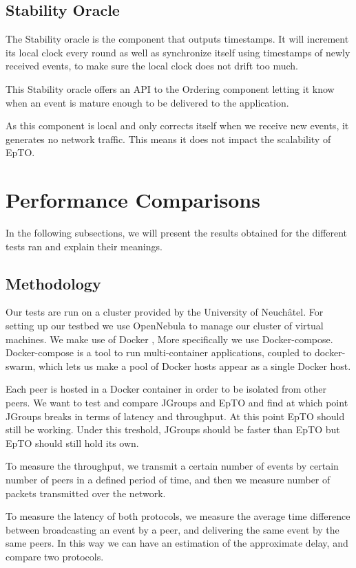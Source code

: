 \documentclass[10pt,conference,a4paper]{IEEEtran}
\begin{document}
\subsection{Stability Oracle}
The Stability oracle is the component that outputs timestamps. It will increment its local clock every round as well as synchronize itself using timestamps of newly received events, to make sure the local clock does not drift too much.
\par
This Stability oracle offers an API to the Ordering component letting it know when an event is mature enough to be delivered to the application.
\par
As this component is local and only corrects itself when we receive new events, it generates no network traffic. This means it does not impact the scalability of EpTO.
\section{Performance Comparisons}
In the following subsections, we will present the results obtained for the different tests ran and explain their meanings.
\subsection{Methodology}
\label{sub:metho}
Our tests are run on a cluster provided by the University of Neuchâtel. For setting up our testbed we use OpenNebula \autocite{opennebula} to manage our cluster of virtual machines. We make use of Docker \autocite{docker}, More specifically we use Docker-compose. Docker-compose is a tool to run multi-container applications, coupled to docker-swarm, which lets us make a pool of Docker hosts appear as a single Docker host.
\par
Each peer is hosted in a Docker container in order to be isolated from other peers. We want to test and compare JGroups and EpTO and find at which point JGroups breaks in terms of latency and throughput. At this point EpTO should still be working. Under this treshold, JGroups should be faster than EpTO but EpTO should still hold its own.
\par
To measure the throughput, we transmit a certain number of events by certain number of peers in a defined period of time, and then we measure number of packets transmitted over the network.
\par
To measure the latency of both protocols, we measure the average time difference between broadcasting an event by a peer, and delivering the same event by the same peers. In this way we can have an estimation of the approximate delay, and compare two protocols.
\end{document}
